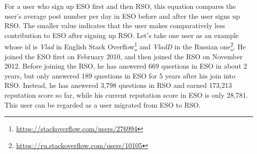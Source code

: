 For a user who sign up ESO first and then RSO, this equation compares the user's average post number per day in ESO before and after the user signs up RSO.
The smaller value indicates that the user makes comparatively less contribution to ESO after signing up RSO.
Let's take one user as an example whose id is \textit{Vlad} in English Stack Overflow\footnote{\url{https://stackoverflow.com/users/276994}} and \textit{VladD} in the Russian one\footnote{\url{https://ru.stackoverflow.com/users/10105}}.  
He joined the ESO first on February 2010, and then joined the RSO on November 2012.
Before joining the RSO, he has answered 669 questions in ESO in about 2 years, but only answered 189 questions in ESO for 5 years after his join into RSO. 
Instead, he has answered 3,798 questions in RSO and earned 173,213 reputation score so far, while his current reputation score in ESO is only 28,781.
This user can be regarded as a user migrated from ESO to RSO.

